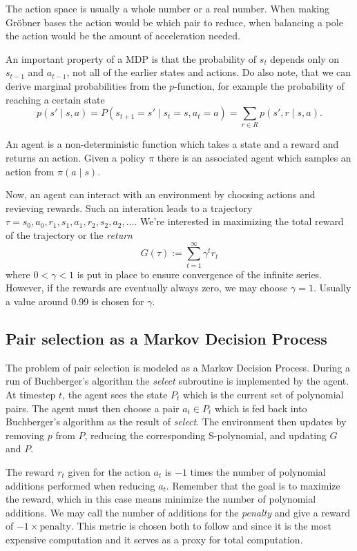 \documentclass{article}
\theoremstyle{changedot}
\theoremstyle{changedotbreak}
\theoremstyle{nonumberplain}
\begin{document}
The action space is usually a whole number or a real number. When making Gröbner bases the action would be which pair to reduce, when balancing a pole the action would be the amount of acceleration needed.

An important property of a MDP is that the probability of $s_{t}$ depends only on $s_{t-1}$ and $a_{t-1}$, not all of the earlier states and actions. Do also note, that we can derive marginal probabilities from the $p$-function, for example the probability of reaching a certain state \[p(s' \mid s, a) = P(s_{t+1} = s' \mid s_{t} = s, a_{t} = a) = \sum_{r \in R} p(s', r \mid s, a).\]

An agent is a non-deterministic function which takes a state and a reward and returns an action. Given a policy $\pi$ there is an associated agent which samples an action from $\pi(a \mid s)$.

Now, an agent can interact with an environment by choosing actions and revieving rewards. Such an interation leads to a trajectory $\tau = s_{0}, a_{0}, r_{1}, s_{1}, a_{1}, r_{2}, s_{2}, a_{2}, \dots$. We're interested in maximizing the total reward of the trajectory or the \emph{return} \[G(\tau) := \sum_{t=1}^{\infty} \gamma^{t} r_{t}\] where $0 < \gamma < 1$ is put in place to ensure convergence of the infinite series. However, if the rewards are eventually always zero, we may choose $\gamma = 1$. Usually a value around 0.99 is chosen for $\gamma$.

\subsection{Pair selection as a Markov Decision Process}
The problem of pair selection is modeled as a Markov Decision Process. During a run of Buchberger's algorithm the \emph{select} subroutine is implemented by the agent. At timestep $t$, the agent sees the state $P_{t}$ which is the current set of polynomial pairs. The agent must then choose a pair $a_{t} \in P_{t}$ which is fed back into Buchberger's algorithm as the result of \emph{select}. The environment then updates by removing $p$ from $P$, reducing the corresponding S-polynomial, and updating $G$ and $P$.

The reward $r_{t}$ given for the action $a_{t}$ is $-1$ times the number of polynomial additions performed when reducing $a_{t}$. Remember that the goal is to maximize the reward, which in this case means minimize the number of polynomial additions. We may call the number of additions for the \emph{penalty} and give a reward of $-1 \times \text{penalty}$. This metric is chosen both to follow \cite{peifer} and since it is the most expensive computation and it serves as a proxy for total computation.
\end{document}
